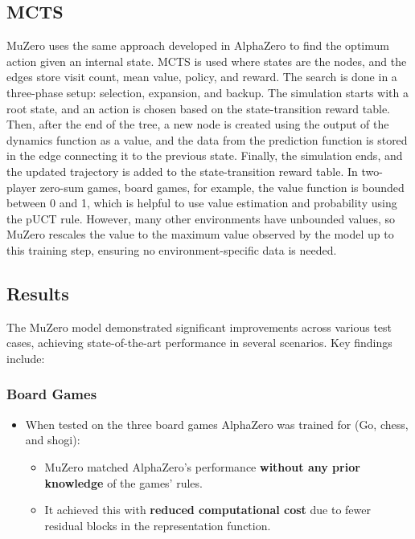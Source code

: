 \subsection{MCTS}
MuZero uses the same approach developed in AlphaZero to find the optimum action
given an internal state. MCTS is used where states are the nodes, and the edges
store visit count, mean value, policy, and reward. The search is done in a
three-phase setup: selection, expansion, and backup. The simulation starts with
a root state, and an action is chosen based on the state-transition reward
table. Then, after the end of the tree, a new node is created using the output
of the dynamics function as a value, and the data from the prediction function
is stored in the edge connecting it to the previous state. Finally, the
simulation ends, and the updated trajectory is added to the state-transition
reward table. In two-player zero-sum games, board games, for example, the value
function is bounded between 0 and 1, which is helpful to use value estimation
and probability using the pUCT rule. However, many other environments have
unbounded values, so MuZero rescales the value to the maximum value observed by
the model up to this training step, ensuring no environment-specific data is
needed.\cite{mz1}

\subsection{Results}
The MuZero model demonstrated significant improvements across various test
cases, achieving state-of-the-art performance in several scenarios. Key
findings include:

\subsubsection{Board Games}
\begin{itemize}
    \item When tested on the three board games AlphaZero was trained for (Go, chess, and
          shogi):
          \begin{itemize}
              \item MuZero matched AlphaZero's performance \textbf{without any prior knowledge} of
                    the games' rules.
              \item It achieved this with \textbf{reduced computational cost} due to fewer residual
                    blocks in the representation function.
          \end{itemize}
\end{itemize}

